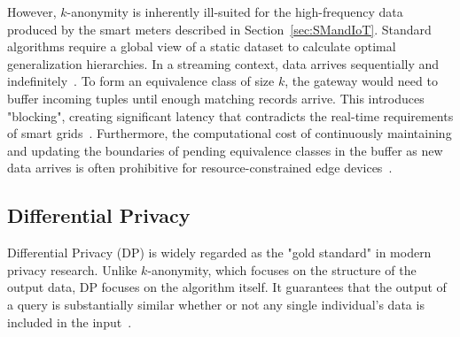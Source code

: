 However, $k$-anonymity is inherently ill-suited for the high-frequency data produced by the smart meters described in Section~\ref{sec:SMandIoT}. Standard algorithms require a global view of a static dataset to calculate optimal generalization hierarchies. In a streaming context, data arrives sequentially and indefinitely~\cite{AnonymizationDataStreams}. To form an equivalence class of size $k$, the gateway would need to buffer incoming tuples until enough matching records arrive. This introduces "blocking", creating significant latency that contradicts the real-time requirements of smart grids~\cite{zanonDataStreams}. Furthermore, the computational cost of continuously maintaining and updating the boundaries of pending equivalence classes in the buffer as new data arrives is often prohibitive for resource-constrained edge devices~\cite{AnonymizationDataStreams}.

\subsection{Differential Privacy}
Differential Privacy (DP) is widely regarded as the "gold standard" in modern privacy research. Unlike $k$-anonymity, which focuses on the structure of the output data, DP focuses on the algorithm itself. It guarantees that the output of a query is substantially similar whether or not any single individual’s data is included in the input~\cite{DifferentialPrivacy}.


